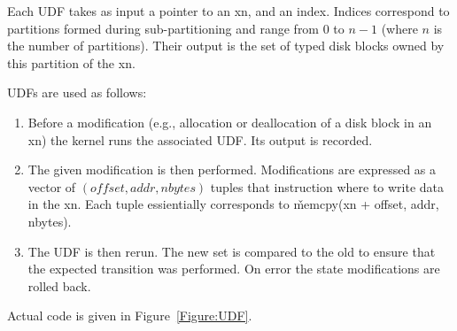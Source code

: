 Each UDF takes as input a pointer to an xn, and an index.  Indices
correspond to partitions formed during sub-partitioning and range
from $0$ to $n-1$ (where $n$ is the number of partitions).  Their
output is the set of typed disk blocks owned by this partition of
the xn.

UDFs are used as follows:
\begin{enumerate}
	\item Before a modification (e.g., allocation or deallocation
	of a disk block in an xn) the kernel runs the associated UDF.
	Its output is recorded.

	\item The given modification is then performed.  Modifications
	are expressed as a vector of $(offset, addr, nbytes)$ tuples
	that instruction where to write data in the xn.  Each tuple
	essientially corresponds to \v{memcpy(xn + offset, addr,
	nbytes)}.

	\item The UDF is then rerun.  The new set is compared to the
	old to ensure that the expected transition was performed.  On
	error the state modifications are rolled back.
\end{enumerate}

Actual code is given in Figure~\ref{Figure:UDF}.

